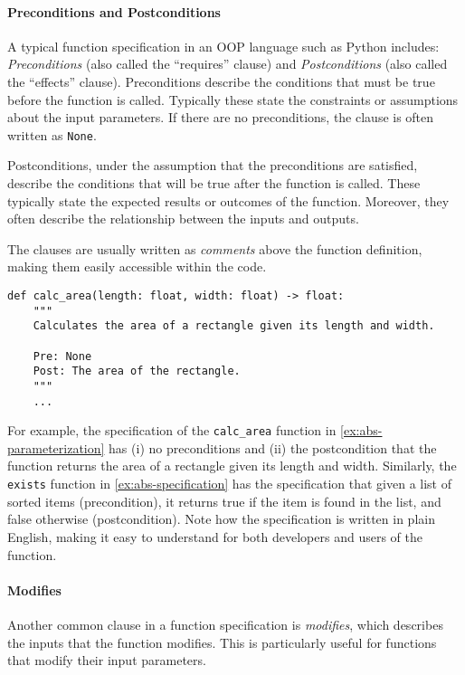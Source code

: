\documentclass[oneside,11pt,dvipsnames]{book}
\newcommand{\code}[1]{\texttt{#1}}
\begin{document}
\paragraph{Preconditions and Postconditions}

A typical function specification in an OOP language such as Python includes: \emph{Preconditions} (also called the ``requires'' clause) and \emph{Postconditions} (also called the ``effects'' clause). Preconditions describe the conditions that must be true before the function is called. Typically these state the constraints or assumptions about the input parameters. If there are no preconditions, the clause is often written as \code{None}.

Postconditions, under the assumption that the preconditions are satisfied, describe the conditions that will be true after the function is called. These typically state the expected results or outcomes of the function. Moreover, they often describe the relationship between the inputs and outputs.


The clauses are usually written as \emph{comments} above the function definition, making them easily accessible within the code.


\begin{lstlisting}
def calc_area(length: float, width: float) -> float:
    """
    Calculates the area of a rectangle given its length and width.

    Pre: None
    Post: The area of the rectangle.
    """
    ...
\end{lstlisting}

For example, the specification of the \code{calc\_area} function in \autoref{ex:abs-parameterization} has (i) no preconditions and (ii) the postcondition that the function returns the area of a rectangle given its length and width.  Similarly, the \code{exists} function in \autoref{ex:abs-specification} has the specification that given a list of sorted items (precondition), it returns true if the item is found in the list, and false otherwise (postcondition).  Note how the specification is written in plain English, making it easy to understand for both developers and users of the function.


\paragraph{Modifies} Another common clause in a function specification is \emph{modifies}, which describes the inputs that the function modifies. This is particularly useful for functions that modify their input parameters.
\end{document}
